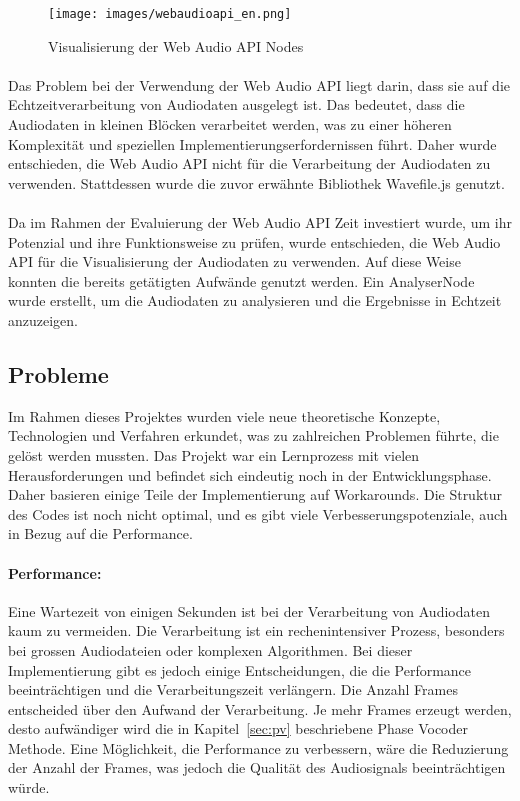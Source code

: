 \begin{figure}[h]
    \centering
    \texttt{[image: images/webaudioapi\_en.png]}
    \caption{Visualisierung der Web Audio API Nodes}
    \label{fig:webaudioapi}
\end{figure}

\paragraph{}
Das Problem bei der Verwendung der Web Audio API liegt darin, dass sie auf die Echtzeitverarbeitung von Audiodaten ausgelegt ist. Das bedeutet, dass die Audiodaten in kleinen Blöcken verarbeitet werden, was zu einer höheren Komplexität und speziellen Implementierungserfordernissen führt. Daher wurde entschieden, die Web Audio API nicht für die Verarbeitung der Audiodaten zu verwenden. Stattdessen wurde die zuvor erwähnte Bibliothek Wavefile.js genutzt.

\paragraph{}
Da im Rahmen der Evaluierung der Web Audio API Zeit investiert wurde, um ihr Potenzial und ihre Funktionsweise zu prüfen, wurde entschieden, die Web Audio API für die Visualisierung der Audiodaten zu verwenden. Auf diese Weise konnten die bereits getätigten Aufwände genutzt werden. Ein AnalyserNode wurde erstellt, um die Audiodaten zu analysieren und die Ergebnisse in Echtzeit anzuzeigen.

\subsection{Probleme}
Im Rahmen dieses Projektes wurden viele neue theoretische Konzepte, Technologien und Verfahren erkundet, was zu zahlreichen Problemen führte, die gelöst werden mussten. Das Projekt war ein Lernprozess mit vielen Herausforderungen und befindet sich eindeutig noch in der Entwicklungsphase. Daher basieren einige Teile der Implementierung auf Workarounds. Die Struktur des Codes ist noch nicht optimal, und es gibt viele Verbesserungspotenziale, auch in Bezug auf die Performance.

\paragraph{Performance:}
Eine Wartezeit von einigen Sekunden ist bei der Verarbeitung von Audiodaten kaum zu vermeiden. Die Verarbeitung ist ein rechenintensiver Prozess, besonders bei grossen Audiodateien oder komplexen Algorithmen. Bei dieser Implementierung gibt es jedoch einige Entscheidungen, die die Performance beeinträchtigen und die Verarbeitungszeit verlängern. Die Anzahl Frames entscheided über den Aufwand der Verarbeitung. Je mehr Frames erzeugt werden, desto aufwändiger wird die in Kapitel~\ref{sec:pv} beschriebene Phase Vocoder Methode. Eine Möglichkeit, die Performance zu verbessern, wäre die Reduzierung der Anzahl der Frames, was jedoch die Qualität des Audiosignals beeinträchtigen würde.

